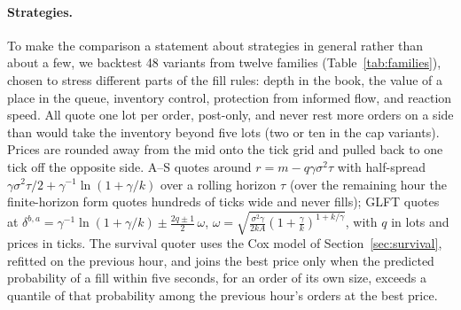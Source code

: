 \paragraph{Strategies.}
To make the comparison a statement about strategies in general rather than about
a few, we backtest 48 variants from twelve families (Table~\ref{tab:families}),
chosen to stress different parts of the fill rules: depth in the book, the value
of a place in the queue, inventory control, protection from informed flow, and
reaction speed. All quote one lot per order, post-only, and never rest more
orders on a side than would take the inventory beyond five lots (two or ten in
the cap variants). Prices are rounded away from the mid onto the tick grid and
pulled back to one tick off the opposite side. A--S quotes around
$r=m-q\gamma\sigma^2\tau$ with half-spread
$\gamma\sigma^2\tau/2+\gamma^{-1}\ln(1+\gamma/k)$ over a rolling horizon $\tau$
(over the remaining hour the finite-horizon form quotes hundreds of ticks wide and
never fills); GLFT quotes at
$\delta^{b,a}=\gamma^{-1}\ln(1+\gamma/k)\pm\frac{2q\pm1}{2}\,\omega$,
$\omega=\sqrt{\frac{\sigma^2\gamma}{2kA}\left(1+\frac{\gamma}{k}\right)^{1+k/\gamma}}$,
with $q$ in lots and prices in ticks. The survival quoter uses the Cox model of
Section~\ref{sec:survival}, refitted on the previous hour, and joins the best
price only when the predicted probability of a fill within five seconds, for an
order of its own size, exceeds a quantile of that probability among the previous
hour's orders at the best price.

